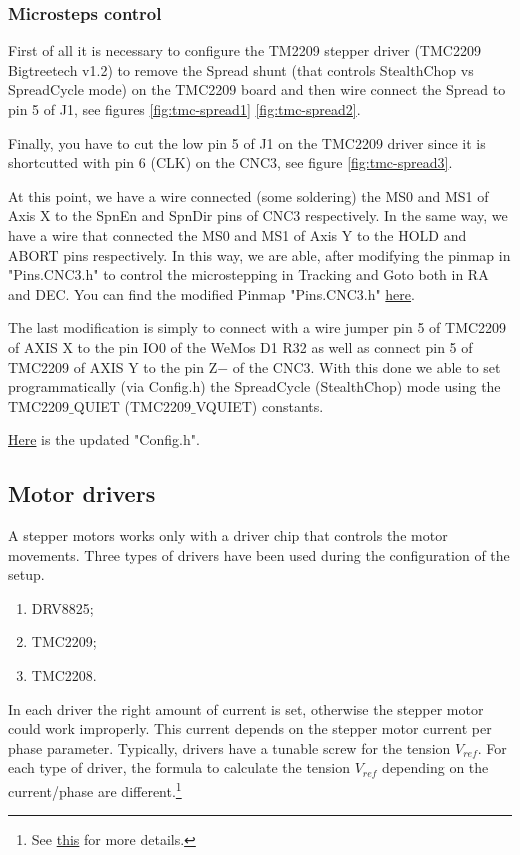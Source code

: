 \subsubsection{Microsteps control}
First of all it is necessary to configure the TM2209 stepper driver (TMC2209 Bigtreetech v1.2) to remove the Spread shunt (that controls StealthChop vs SpreadCycle mode) on the TMC2209 board and then wire connect the Spread to pin 5 of J1, see figures \ref{fig:tmc-spread1} \ref{fig:tmc-spread2}.

Finally, you have to cut the low pin 5 of J1 on the TMC2209 driver since it is shortcutted with pin 6 (CLK) on the CNC3, see figure \ref{fig:tmc-spread3}.

At this point, we have a wire connected (some soldering) the MS0 and MS1 of Axis X to the SpnEn and SpnDir pins of CNC3 respectively. In the same way, we have a wire that connected the MS0 and MS1 of Axis Y to the HOLD and ABORT pins respectively. In this way, we are able, after modifying the pinmap in "Pins.CNC3.h" to control the microstepping in Tracking and Goto both in RA and DEC.
You can find the modified Pinmap "Pins.CNC3.h" \href{https://github.com/sebastiano123-c/Motorize-a-1980-telescope/blob/main/OnStep/src/pinmaps/Pins.CNC3.h}{here}.

The last modification is simply to connect with a wire jumper pin 5 of TMC2209 of AXIS X to the pin IO0 of the WeMos D1 R32 as well as connect pin 5 of TMC2209 of AXIS Y to the pin Z\(-\) of the CNC3.
With this done we able to set programmatically (via Config.h) the SpreadCycle (StealthChop) mode using the TMC2209\(\_\)QUIET (TMC2209\(\_\)VQUIET) constants.

\href{https://github.com/sebastiano123-c/Motorize-a-1980-telescope/blob/main/OnStep/Config.h}{Here} is the updated "Config.h".

\subsection{Motor drivers}
A stepper motors works only with a driver chip that controls the motor movements.
Three types of drivers have been used during the configuration of the setup.
\begin{enumerate}
    \item DRV8825;
    \item TMC2209;
    \item TMC2208.
\end{enumerate}

In each driver the right amount of current is set, otherwise the stepper motor could work improperly.
This current depends on the stepper motor current per phase parameter.
Typically, drivers have a tunable screw for the tension \(V_{ref}\).
For each type of driver, the formula to calculate the tension \(V_{ref}\) depending on the current/phase are different.\footnote{See \href{https://all3dp.com/2/vref-calculator-tmc2209-tmc2208-a4988/}{this} for more details.}

